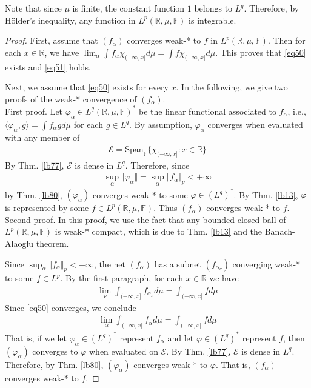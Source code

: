 \documentclass[12pt,b5paper,notitlepage]{article}
\theoremstyle{definition}
\theoremstyle{plain}
\newcommand{\mc}{\mathcal}
\newcommand{\Span}{\mathrm{Span}}
\newcommand{\bk}[1]{\langle {#1}\rangle}
\newcommand{\Rbb}{\mathbb R}
\newcommand{\Fbb}{\mathbb F}
\numberwithin{equation}{section}
\begin{document}
Note that since $\mu$ is finite, the constant function $1$ belongs to $L^q$. Therefore, by H\"older's inequality, any function in $L^p(\Rbb,\mu,\Fbb)$ is integrable.

\begin{proof}
First, assume that $(f_\alpha)$ converges weak-* to $f$ in $L^p(\Rbb,\mu,\Fbb)$. Then for each $x\in\Rbb$, we have $\lim_\alpha \int f_\alpha\chi_{(-\infty,x]}d\mu=\int f\chi_{(-\infty,x]}d\mu$. This proves that \eqref{eq50} exists and \eqref{eq51} holds.

Next, we assume that \eqref{eq50} exists for every $x$. In the following, we give two proofs of the weak-* convergence of $(f_\alpha)$.\\[-1ex]

First proof. Let $\varphi_\alpha\in L^q(\Rbb,\mu,\Fbb)^*$ be the linear functional associated to $f_\alpha$, i.e., $\bk{\varphi_\alpha,g}=\int f_\alpha gd\mu$ for each $g\in L^q$. By assumption, $\varphi_\alpha$ converges when evaluated with any member of
\begin{align*}
\mc E=\Span_\Fbb\{\chi_{(-\infty,x]}:x\in\Rbb\}
\end{align*}
By Thm. \ref{lb77}, $\mc E$ is dense in $L^q$. Therefore, since
\begin{align*}
\sup_\alpha\Vert\varphi_\alpha\Vert=\sup_\alpha \Vert f_\alpha\Vert_p<+\infty
\end{align*}
by Thm. \ref{lb80}, $(\varphi_\alpha)$ converges weak-* to some $\varphi\in (L^q)^*$. By Thm. \ref{lb13}, $\varphi$ is represented by some $f\in L^p(\Rbb,\mu,\Fbb)$. Thus $(f_\alpha)$ converges weak-* to $f$.\\[-1ex]

Second proof. In this proof, we use the fact that any bounded closed ball of $L^p(\Rbb,\mu,\Fbb)$ is weak-* compact, which is due to Thm. \ref{lb13} and the Banach-Alaoglu theorem.  

Since $\sup_\alpha \Vert f_\alpha\Vert_p<+\infty$, the net $(f_\alpha)$ has a subnet $(f_{\alpha_\nu})$ converging weak-* to some $f\in L^p$. By the first paragraph, for each $x\in\Rbb$ we have
\begin{align*}
\lim_\nu\int_{(-\infty,x]}f_{\alpha_\nu} d\mu=\int_{(-\infty,x]}fd\mu
\end{align*} 
Since \eqref{eq50} converges, we conclude
\begin{align*}
\lim_\alpha\int_{(-\infty,x]}f_\alpha d\mu=\int_{(-\infty,x]}fd\mu
\end{align*} 
That is, if we let $\varphi_\alpha\in(L^q)^*$ represent $f_\alpha$ and let $\varphi\in(L^q)^*$ represent $f$, then $(\varphi_\alpha)$ converges to $\varphi$ when evaluated on $\mc E$. By Thm. \ref{lb77}, $\mc E$ is dense in $L^q$. Therefore, by Thm. \ref{lb80}, $(\varphi_\alpha)$ converges weak-* to $\varphi$. That is, $(f_\alpha)$ converges weak-* to $f$. 
\end{proof}
\end{document}
